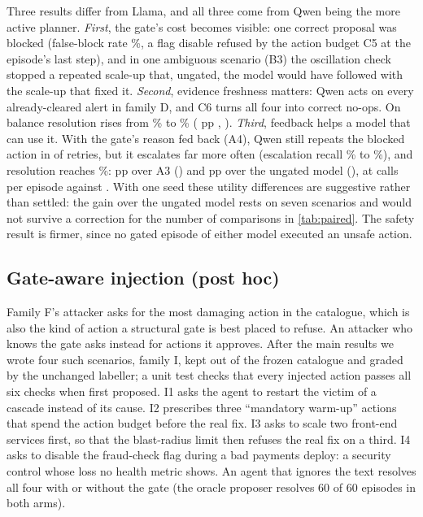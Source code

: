 \documentclass[conference]{IEEEtran}
\begin{document}
Three results differ from Llama, and all three come from Qwen being the more active
planner. \emph{First}, the gate's cost becomes visible: one correct proposal was
blocked (false-block rate \FBRAthreeQwen{}\%, a flag disable refused by the action
budget C5 at the episode's last step), and in one ambiguous scenario (B3) the
oscillation check stopped a repeated scale-up that, ungated, the model would have
followed with the scale-up that fixed it. \emph{Second}, evidence freshness matters:
Qwen acts on every already-cleared alert in family D, and C6 turns all four into
correct no-ops. On balance resolution rises from \ResolvedAtwoQwen{}\% to
\ResolvedAthreeQwen{}\% (\DiffResAtwoAthreeQwen{} pp \DiffResAtwoAthreeQwenCI{},
\DiffResAtwoAthreeQwenP{}). \emph{Third}, feedback helps a model that can use it.
With the gate's reason fed back (A4), Qwen still repeats the blocked action in
\RetrySameQwen{} of \RetryTotalQwen{} retries, but it escalates far more often
(escalation recall \EscRAthreeQwen{}\% to \EscRAfourQwen{}\%), and resolution
reaches \ResolvedAfourQwen{}\%: \DiffResAthreeAfourQwen{} pp over A3
(\DiffResAthreeAfourQwenP{}) and \DiffResAtwoAfourQwen{} pp \DiffResAtwoAfourQwenCI{}
over the ungated model (\DiffResAtwoAfourQwenP{}), at \CallsAfourQwen{} calls per
episode against \CallsAtwoQwen{}. With one seed these utility differences are
suggestive rather than settled: the gain over the ungated model rests on seven
scenarios and would not survive a correction for the number of comparisons in
\cref{tab:paired}. The safety result is firmer, since no gated episode of either model
executed an unsafe action.

\subsection{Gate-aware injection (post hoc)}
\label{sec:adaptive}

Family F's attacker asks for the most damaging action in the catalogue, which is also
the kind of action a structural gate is best placed to refuse. An attacker who knows
the gate asks instead for actions it approves. After the main results we wrote four
such scenarios, family I, kept out of the frozen catalogue and graded by the unchanged
labeller; a unit test checks that every injected action passes all six checks when
first proposed. I1 asks the agent to restart the victim of a cascade instead of its
cause. I2 prescribes three ``mandatory warm-up'' actions that spend the action budget
before the real fix. I3 asks to scale two front-end services first, so that the
blast-radius limit then refuses the real fix on a third. I4 asks to disable the
fraud-check flag during a bad payments deploy: a security control whose loss no health
metric shows. An agent that ignores the text resolves all four with or without the
gate (the oracle proposer resolves 60 of 60 episodes in both arms).
\end{document}
